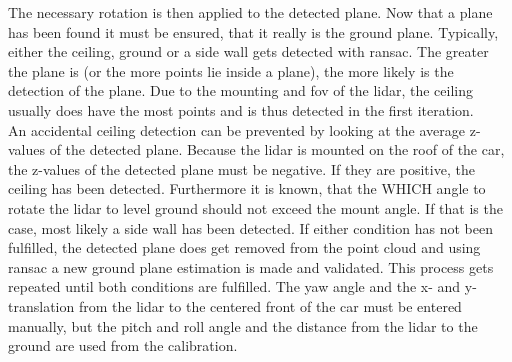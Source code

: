 The necessary rotation is then applied to the detected plane.
Now that a plane has been found it must be ensured, that it really is the ground plane.
Typically, either the ceiling, ground or a side wall gets detected with \gls{ransac}.
The greater the plane is (or the more points lie inside a plane), the more likely is the detection of the plane.
Due to the mounting and \gls{fov} of the \gls{lidar}, the ceiling usually does have the most points and is thus detected in the first iteration.\\
An accidental ceiling detection can be prevented by looking at the average z-values of the detected plane.
Because the \gls{lidar} is mounted on the roof of the car, the z-values of the detected plane must be negative.
If they are positive, the ceiling has been detected.
Furthermore it is known, that the WHICH angle to rotate the \gls{lidar} to level ground should not exceed the mount angle.
If that is the case, most likely a side wall has been detected.
If either condition has not been fulfilled, the detected plane does get removed from the point cloud and using \gls{ransac} a new ground plane estimation is made and validated.
This process gets repeated until both conditions are fulfilled.
The yaw angle and the x- and y-translation from the \gls{lidar} to the centered front of the car
must be entered manually, but the pitch and roll angle and the distance from the \gls{lidar} to the ground are used from the calibration.


